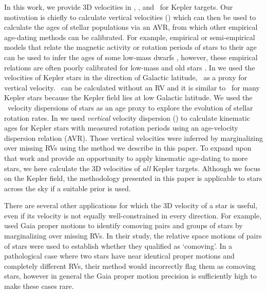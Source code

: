 In this work, we provide 3D velocities in \vx, \vy, and \vz\ for Kepler
targets.
Our motivation is chiefly to calculate vertical velocities (\vz) which can
then be used to calculate the ages of stellar populations via an AVR, from
which other empirical age-dating methods can be calibrated.
For example, empirical or semi-empirical models that relate the magnetic
activity or rotation periods of stars to their age can be used to infer the
ages of some low-mass dwarfs \citep[\eg][]{skumanich1972, barnes2003,
barnes2007, mamajek2008, matt2012, angus2019, claytor2020}, however, these
empirical relations are often poorly calibrated for low-mass and old stars
\citep[\eg][]{angus2015, vansaders2016, vansaders2018, metcalfe2019,
curtis2020, spada2019, angus2020}.
In \citet{angus2020} we used the velocities of Kepler stars in the direction
of Galactic latitude, \vb\, as a proxy for vertical velocity.
\vb\ can be calculated without an RV and it is similar to \vz\ for many Kepler
stars because the Kepler field lies at low Galactic latitude.
We used the \vb\ velocity dispersions of stars as an age proxy to explore the
evolution of stellar rotation rates.
In \citet{lu2021} we used {\it vertical} velocity dispersion (\vz) to
calculate kinematic ages for Kepler stars with measured rotation periods using
an age-velocity dispersion relation (AVR).
Those vertical velocities were inferred by marginalizing over missing RVs
using the method we describe in this paper.
To expand upon that work and provide an opportunity to apply kinematic
age-dating to more stars, we here calculate the 3D velocities of {\it all}
Kepler targets.
Although we focus on the Kepler field, the methodology presented in this paper
is applicable to stars across the sky if a suitable prior is used.

There are several other applications for which the 3D velocity of a star is
useful, even if its velocity is not equally well-constrained in every
direction.
For example, \citet{oh2017} used Gaia proper motions to identify comoving
pairs and groups of stars by marginalizing over missing RVs.
In their study, the relative space motions of pairs of stars were used to
establish whether they qualified as `comoving'.
In a pathological case where two stars have near identical proper motions and
completely different RVs, their method would incorrectly flag them as comoving
stars, however in general the Gaia proper motion precision is sufficiently
high to make these cases rare.

